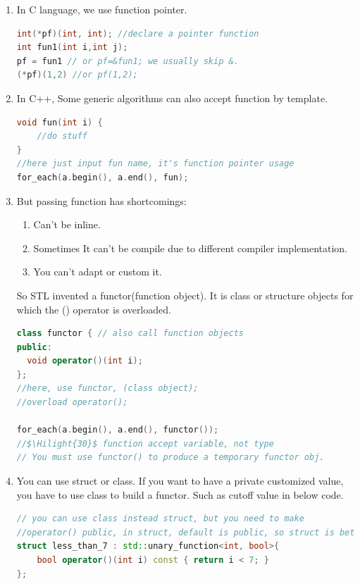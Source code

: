 \documentclass[a4paper,11pt,twoside]{book}
\newcommand{\Hilight}[1]{\makebox[0pt][l]{\color{yellow}\rule[-3pt]{#1em}{11pt}}}
\newcommand{\Hilight}[1]{}
\begin{document}
\begin{enumerate}
\item  In C language, we use function pointer.
\begin{lstlisting}[frame=single, language=c++]
int(*pf)(int, int); //declare a pointer function
int fun1(int i,int j);
pf = fun1 // or pf=&fun1; we usually skip &.
(*pf)(1,2) //or pf(1,2);
\end{lstlisting}

\item In C++, Some generic algorithms can also accept function by template.
\begin{lstlisting}[frame=single, language=c++]
void fun(int i) {
	//do stuff
}
//here just input fun name, it's function pointer usage
for_each(a.begin(), a.end(), fun);
\end{lstlisting}

\item But passing function has shortcomings:
\begin{enumerate}
	\item Can't be inline.
	\item Sometimes It can't be compile due to different compiler implementation.
	\item You can't adapt or custom it.
\end{enumerate}
So STL invented a functor(function object). It is class or structure objects for which the () operator is overloaded.

\begin{lstlisting}[frame=single, language=c++]
class functor { // also call function objects
public:
  void operator()(int i);
};
//here, use functor, (class object);
//overload operator();

for_each(a.begin(), a.end(), functor());
//$\Hilight{30}$ function accept variable, not type
// You must use functor() to produce a temporary functor obj.
\end{lstlisting}

\item  You can use struct or class. If you want to have a private customized  value, you have to use class to build a functor.  Such as cutoff value in below code.
\begin{lstlisting}[frame=single, language=c++]
// you can use class instead struct, but you need to make
//operator() public, in struct, default is public, so struct is better!
struct less_than_7 : std::unary_function<int, bool>{
    bool operator()(int i) const { return i < 7; }
};


\end{lstlisting}
\end{enumerate}
\end{document}
